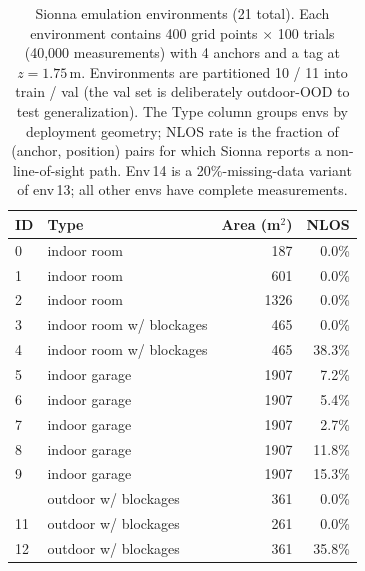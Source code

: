 
\begin{table}[t]
\centering
\caption{Sionna emulation environments (21 total). Each environment
contains 400 grid points $\times$ 100 trials (40{,}000 measurements)
with 4 anchors and a tag at $z{=}1.75$\,m. Environments are
partitioned 10 / 11 into train / val (the val set is deliberately
outdoor-OOD to test generalization). The Type column groups envs
by deployment geometry; NLOS rate is the fraction of
(anchor, position) pairs for which Sionna reports a
non-line-of-sight path. Env\,14 is a 20\%-missing-data variant
of env\,13; all other envs have complete measurements.}
\label{tab:envs}
\small
\begin{tabular}{l l r r}
\toprule
{ID} & {Type} & {Area (m$^2$)} & {NLOS} \\
\midrule
0  & indoor room              & 187   & 0.0\%  \\
1  & indoor room              & 601   & 0.0\%  \\
2  & indoor room              & 1326  & 0.0\%  \\
3  & indoor room w/ blockages & 465   & 0.0\%  \\
4  & indoor room w/ blockages & 465   & 38.3\% \\
5  & indoor garage            & 1907  & 7.2\%  \\
6  & indoor garage            & 1907  & 5.4\%  \\
7  & indoor garage            & 1907  & 2.7\%  \\
8  & indoor garage            & 1907  & 11.8\% \\
9  & indoor garage            & 1907  & 15.3\% \\
\addlinespace
10 & outdoor w/ blockages     & 361   & 0.0\%  \\
11 & outdoor w/ blockages     & 261   & 0.0\%  \\
12 & outdoor w/ blockages     & 361   & 35.8\% \\

\end{tabular}
\end{table}
